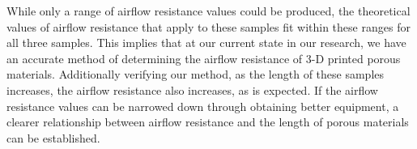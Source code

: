 	While only a range of airflow resistance values could be produced, the theoretical 
values of airflow resistance that apply to these samples fit within these ranges for all 
three samples. This implies that at our current state in our research, we have an accurate 
method of determining the airflow resistance of 3-D printed porous materials. Additionally 
verifying our method, as the length of these samples increases, the airflow resistance also 
increases, as is expected. If the airflow resistance values can be narrowed down through 
obtaining better equipment, a clearer relationship between airflow resistance and the length 
of porous materials can be established. 
